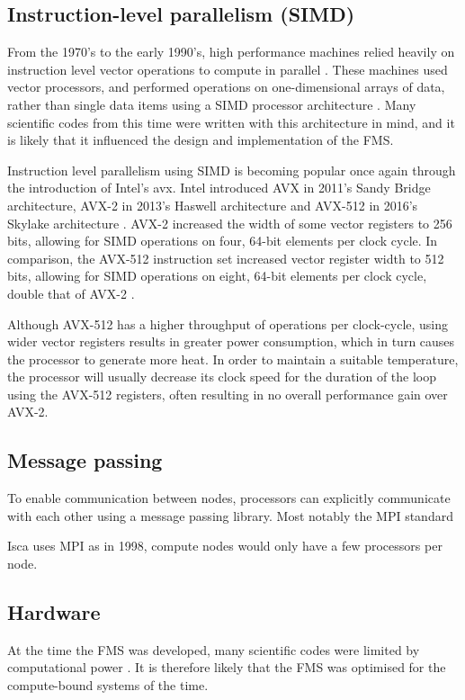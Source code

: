 \documentclass[a4paper,11pt]{report}
\begin{document}
\subsection{Instruction-level parallelism (SIMD)}
From the 1970's to the early 1990's, high performance machines relied heavily on instruction level vector operations to compute in parallel \cite{6877473}. These machines used vector processors, and performed operations on one-dimensional arrays of data, rather than single data items using a SIMD processor architecture \cite{conte2000long}. Many scientific codes from this time were written with this architecture in mind, and it is likely that it influenced the design and implementation of the FMS. 
\par
Instruction level parallelism using SIMD is becoming popular once again through the introduction of Intel's \gls{avx}. Intel introduced AVX in 2011's Sandy Bridge architecture, AVX-2 in 2013's Haswell architecture and AVX-512 in 2016's Skylake architecture \cite{chris2011avx, intel2019avx}. AVX-2 increased the width of some vector registers to 256 bits, allowing for SIMD operations on four, 64-bit elements per clock cycle. In comparison, the AVX-512 instruction set increased vector register width to 512 bits, allowing for SIMD operations on eight, 64-bit elements per clock cycle, double that of AVX-2 \cite{chris2011avx,xeon2680v4}.
\par
Although AVX-512 has a higher throughput of operations per clock-cycle, using wider vector registers results in greater power consumption, which in turn causes the processor to generate more heat. In order to maintain a suitable temperature, the processor will usually decrease its clock speed for the duration of the loop using the AVX-512 registers, often resulting in no overall performance gain over AVX-2.


\subsection{Message passing}
To enable communication between nodes, processors can explicitly communicate with each other using a message passing library. Most notably the MPI standard

Isca uses MPI as in 1998, compute nodes would only have a few processors per node. 

\subsection{Hardware}
At the time the FMS was developed, many scientific codes were limited by computational power \cite{mccalpin1995memory}. It is therefore likely that the FMS was optimised for the compute-bound systems of the time. 
\end{document}
